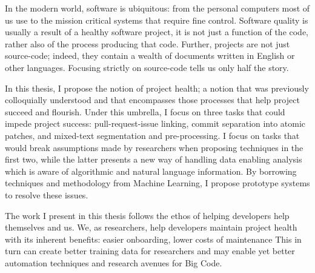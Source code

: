 \begin{impactstatement}

In the modern world, software is ubiquitous: from the personal computers most of
us use to the mission critical systems that require fine control. Software
quality is usually a result of a healthy software project, \ie it is not just a
function of the code, rather also of the process producing that code.
Further, projects are not just source-code; indeed, they contain a wealth of
documents written in English or other languages. Focusing strictly on
source-code tells us only half the story.

In this thesis, I propose the notion of project health; a notion that was
previously colloquially understood and that encompasses those processes that
help project succeed and flourish. Under this umbrella, I focus on three tasks
that could impede project success: pull-request-issue linking, commit separation
into atomic patches, and mixed-text segmentation and pre-processing. I focus on
tasks that would break assumptions made by researchers when proposing techniques
in the first two, while the latter presents a new way of handling data enabling
analysis which is aware of algorithmic and natural language information. By
borrowing techniques and methodology from Machine Learning, I propose prototype
systems to resolve these issues.

The work I present in this thesis follows the ethos of helping developers help
themselves and us. We, as researchers, help developers maintain project health
with its inherent benefits: easier onboarding, lower costs of maintenance \etc
This in turn can create better training data for researchers and may enable yet
better automation techniques and research avenues for Big Code.

\end{impactstatement}

